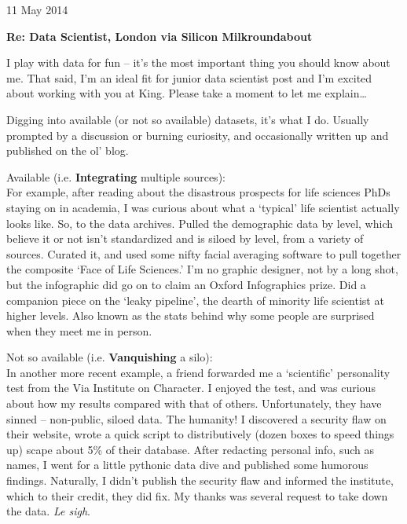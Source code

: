 \documentclass{../res}
\begin{document}
 
\begin{sloppypar}
 
%


\begin{resume} 
 
11 May 2014




\textbf{Re: Data Scientist, London via Silicon Milkroundabout}

I play with data for fun -- it's the most important thing you should know about me. That said, I'm an ideal fit for junior data scientist post and I'm excited about working with you at King. Please take a moment to let me explain\ldots

Digging into available (or not so available) datasets, it's what I do. Usually prompted by a discussion or burning curiosity, and occasionally written up and published on the ol' blog.

Available (i.e. \textbf{Integrating} multiple sources): \\
For example, after reading about the disastrous prospects for life sciences PhDs staying on in academia, I was curious about what a `typical' life scientist actually looks like. So, to the data archives. Pulled the demographic data by level, which believe it or not isn't standardized and is siloed by level, from a variety of sources. Curated it, and used some nifty facial averaging software to pull together the composite `Face of Life Sciences.' I'm no graphic designer, not by a long shot, but the infographic did go on to claim an Oxford Infographics prize. Did a companion piece on the `leaky pipeline', the dearth of minority life scientist at higher levels. Also known as the stats behind why some people are surprised when they meet me in person.

Not so available (i.e. \textbf{Vanquishing} a silo):\\
In another more recent example, a friend forwarded me a `scientific' personality test from the Via Institute on Character. I enjoyed the test, and was curious about how my results compared with that of others. Unfortunately, they have sinned -- non-public, siloed data. The humanity! I discovered a security flaw on their website, wrote a quick script to distributively (dozen boxes to speed things up) scape about 5\% of their database. After redacting personal info, such as names, I went for a little pythonic data dive and published some humorous findings. Naturally, I didn't publish the security flaw and informed the institute, which to their credit, they did fix. My thanks was several request to take down the data. \textit{Le sigh}.


\end{resume}
\end{sloppypar}
\end{document}
